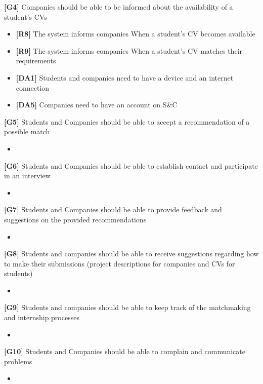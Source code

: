 \textbf{[G4]} Companies should be able to be informed about the availability of a student's CVs
\begin{itemize}
    \item \textbf{[R8]} The system informs companies When a student’s CV becomes available
    \item \textbf{[R9]} The system informs companies When a student’s CV matches their requirements

    \item \textbf{[DA1]} Students and companies need to have a device and an internet connection
    \item \textbf{[DA5]} Companies need to have an account on S\&C
\end{itemize}

\textbf{[G5]} Students and Companies should be able to accept a recommendation of a possible match
\begin{itemize}
    \item 
\end{itemize}

\textbf{[G6]} Students and Companies should be able to establish contact and participate in an interview
\begin{itemize}
    \item 
\end{itemize}

\textbf{[G7]} Students and Companies should be able to provide feedback and suggestions on the provided recommendations
\begin{itemize}
    \item 
\end{itemize}

\textbf{[G8]} Students and companies should be able to receive suggestions regarding how to make their submissions (project descriptions for companies and CVs for students)
\begin{itemize}
    \item 
\end{itemize}

\textbf{[G9]} Students and companies should be able to keep track of the matchmaking and internship processes
\begin{itemize}
    \item 
\end{itemize}

\textbf{[G10]} Students and Companies should be able to complain and communicate problems
\begin{itemize}
    \item 
\end{itemize}


